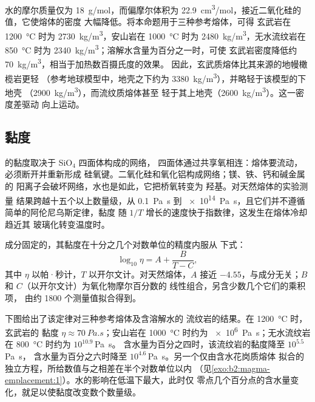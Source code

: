 水的摩尔质量仅为 \qty{18}{g/mol}，而偏摩尔体积为
\qty{22.9}{cm^3/mol}，接近二氧化硅的值，它使熔体的密度
大幅降低。将本命题用于三种参考熔体，可得
玄武岩在 \qty{1200}{\celsius} 时为 \qty{2730}{kg/m^3}，安山岩在
\qty{1000}{\celsius} 时为 \qty{2480}{kg/m^3}，无水流纹岩在
\qty{850}{\celsius} 时为 \qty{2340}{kg/m^3}；溶解水含量为百分之一时，可使
玄武岩密度降低约 \qty{70}{kg/m^3}，相当于加热数百摄氏度的效果。
因此，玄武质熔体比其来源的地幔橄榄岩更轻
（参考地球模型中，地壳之下约为 \qty{3380}{kg/m^3}），并略轻于该模型的下地壳
（\qty{2900}{kg/m^3}），而流纹质熔体甚至
轻于其上地壳（\qty{2600}{kg/m^3}）。这一密度差驱动
向上运动。

\subsection{黏度}

的黏度取决于 SiO$_4$ 四面体构成的网络，
四面体通过共享氧相连：熔体要流动，必须断开并重新形成
硅氧键。二氧化硅和氧化铝构成网络；镁、铁、钙和碱金属的
阳离子会破坏网络，水也是如此，它把桥氧转变为
羟基。对天然熔体的实验测量
结果跨越十五个以上数量级，从 \qty{0.1}{Pa.s} 到
\qty{e14}{Pa.s}，且它们并不遵循简单的阿伦尼乌斯定律，黏度
随 $1/T$ 增长的速度快于指数律，这发生在熔体冷却趋近其
玻璃化转变温度时。

\begin{proposition}\label{prop:b2:magma-emplacement:vft}
成分固定的，其黏度在十分之几个对数单位的精度内服从
下式：
\[
\log_{10}\eta = A + \frac{B}{T - C},
\]
其中 $\eta$ 以帕·秒计，$T$ 以开尔文计。对天然熔体，$A$ 接近
$-4.55$，与成分无关；$B$ 和 $C$（以开尔文计）为氧化物摩尔百分数的
线性组合，另含少数几个它们的乘积项，
由约 \num{1800} 个测量值拟合得到。
\end{proposition}
\admitted

下图给出了该定律对三种参考熔体及含溶解水的
流纹岩的结果。在 \qty{1200}{\celsius} 时，玄武岩的
黏度 $\eta \approx \qty{70}{Pa.s}$；安山岩在 \qty{1000}{\celsius} 时约为
\qty{e6}{Pa.s}；无水流纹岩在 \qty{800}{\celsius} 时约为 $10^{10.9}$\,\unit{Pa.s}。
含水量为百分之四时，该流纹岩的黏度降至 $10^{5.5}$\,\unit{Pa.s}，
含水量为百分之六时降至 $10^{4.6}$\,\unit{Pa.s}。另一个仅由含水花岗质熔体
拟合的独立方程，所给数值与之相差在半个对数单位以内
（见\cref{exo:b2:magma-emplacement:1}）。水的影响在低温下最大，此时仅
零点几个百分点的含水量变化，就足以使黏度改变数个数量级。


